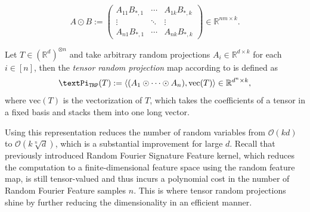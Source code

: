 \documentclass[openany]{book}
\begin{document}
\begin{equation*}
    A\odot B:=\begin{pmatrix}
        A_{11}B_{\ast,1} & \cdots &A_{1k}B_{\ast,k}\\
        \vdots & \ddots & \vdots  \\
        A_{n1}B_{\ast,1} &\cdots &A_{nk}B_{\ast,k}
    \end{pmatrix}\in \mathbb R^{nm\times k}.
\end{equation*}
\begin{definition}
    Let $T\in (\mathbb R^{d})^{\otimes n}$ and take arbitrary random projections $A_i\in \mathbb R^{d\times k}$ for each $i\in [n]$, then the \textit{tensor random projection} map according to \cite{sun2021} is defined as 
    \begin{equation*}
        \gPi_{\mathtt{TRP}}(T):=\langle(A_1\odot \cdots \odot A_n), \mathrm{vec}(T)\rangle\in \mathbb R^{d^n\times k},
    \end{equation*}
    where $\mathrm{vec}(T)$ is the vectorization of $T$, which takes the coefficients of a tensor in a fixed basis and stacks them into one long vector.
\end{definition}
Using this representation reduces the number of random variables from $\mathscr O(kd)$ to $\mathscr O(k\sqrt[n]{d})$, which is a substantial improvement for large $d$.
Recall that previously introduced Random Fourier Signature Feature kernel, which reduces the computation to a finite-dimensional feature space using the random feature map, is still tensor-valued and thus incurs a  polynomial cost in the number of Random Fourier Feature samples $n$. This is where tensor random projections shine by further reducing the dimensionality in an efficient manner.
\end{document}
